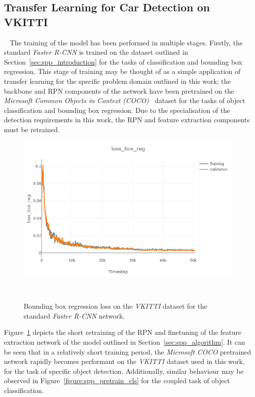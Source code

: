 \subsection{Transfer Learning for Car Detection on VKITTI}
~\label{sec:spp_quantitative_transfer}
The training of the model has been performed in multiple stages. Firstly, the standard \textit{Faster R-CNN} 
is trained on the dataset outlined in Section~\ref{sec:spp_introduction} for the tasks of classification and 
bounding box regression. This stage of training may be thought of as a simple application of transfer learning 
for the specific problem domain outlined in this work; the backbone and RPN components of the network 
have been pretrained on the \textit{Microsoft Common Objects in Context (COCO)}~\cite{Lin2014COCO} dataset for 
the tasks of object classification and bounding box regression. Due to the specialisation of the detection 
requirements in this work, the RPN and feature extraction components must be retrained.

\begin{figure}[!htbp]
  \centering
  \includegraphics[width=.8\linewidth]{figures/spp/quant/rcnn_pretrain/bb.png}
  \caption[VKITTI Bounding Box Training]{Bounding box regression loss on the \textit{VKITTI} 
  dataset for the standard \textit{Faster R-CNN} network.}
~\label{figure:spp_pretrain_bb}
\end{figure}

Figure~\ref{figure:spp_pretrain_bb} depicts the short retraining of the RPN and finetuning of the feature extraction 
network of the model outlined in Section~\ref{sec:spp_algorithm}. It can be seen that in a relatively short training period, 
the \textit{Microsoft COCO} pretrained network rapidly becomes performant on the \textit{VKITTI} dataset used in this work, 
for the task of specific object detection. Additionally, similar behaviour may be observed in Figure~\ref{figure:spp_pretrain_cls} 
for the coupled task of object classification.

